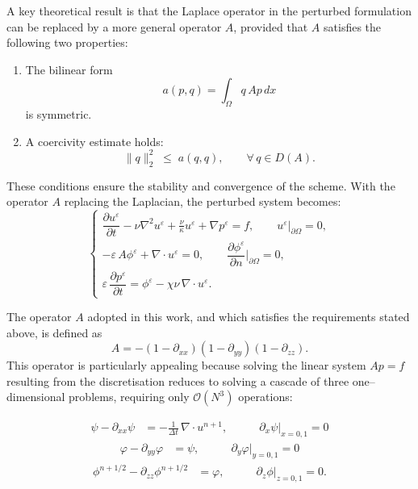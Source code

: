 \documentclass[12pt]{article}
\begin{document}
A key theoretical result is that the Laplace operator in the perturbed formulation 
can be replaced by a more general operator $A$, provided that $A$ satisfies 
the following two properties:

\begin{enumerate}
    \item The bilinear form 
    \[
        a(p,q) = \int_{\Omega} q \, A p \, dx
    \]
    is symmetric.
    
    \item A coercivity estimate holds:
    \[
        \| q \|_{2}^{2} \;\le\; a(q,q), 
        \qquad \forall\, q \in D(A).
    \]
\end{enumerate}

These conditions ensure the stability and convergence of the scheme.  
With the operator $A$ replacing the Laplacian, the perturbed system becomes:
\begin{equation}
\begin{cases}
\dfrac{\partial u^{\varepsilon}}{\partial t}
    - \nu \nabla^{2} u^{\varepsilon}
    + \frac{\nu}{\kappa}u^{\varepsilon}
    + \nabla p^{\varepsilon}
    = f,
    \qquad u^{\varepsilon}|_{\partial\Omega}=0,
\\[8pt]
- \varepsilon\, A \phi^{\varepsilon}
    + \nabla \cdot u^{\varepsilon}
    = 0,
    \qquad \dfrac{\partial \phi^{\varepsilon}}{\partial n}\bigg|_{\partial\Omega}=0,
\\[8pt]
\varepsilon\, \dfrac{\partial p^{\varepsilon}}{\partial t}
    = \phi^{\varepsilon}
    - \chi \nu \, \nabla\cdot u^{\varepsilon}.
\end{cases}
\end{equation}

The operator $A$ adopted in this work, and which satisfies the
requirements stated above, is defined as
\[
A = - (1 - \partial_{xx})(1 - \partial_{yy})(1 - \partial_{zz}).
\]
This operator is particularly appealing because solving the linear system
$A p = f$ resulting from the discretisation reduces to solving a cascade
of three one–dimensional problems, requiring only $\mathcal{O}(N^{3})$
operations:


\begin{align*}
\psi - \partial_{xx}\psi &= -\frac{1}{\Delta t}\, \nabla \cdot u^{n+1},
&\qquad \partial_x \psi|_{x=0,1} = 0
\end{align*}
\begin{align*}
\varphi - \partial_{yy}\varphi &= \psi,
&\qquad \partial_y \varphi|_{y=0,1} = 0
\end{align*}
\begin{align*}
\phi^{n+1/2} - \partial_{zz}\phi^{n+1/2} &= \varphi,
&\qquad \partial_z \phi|_{z=0,1} = 0.
\end{align*}
\end{document}
